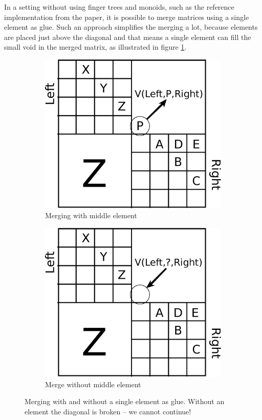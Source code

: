\documentclass[a4paper,12pt,twosided]{report}
\begin{document}
In a setting without using finger trees and monoids, such as the reference
implementation from the paper, it is possible to merge matrices using a single
element as glue. Such an approach simplifies the merging a lot, because elements
are placed just above the diagonal and that means a single element can fill the
small void in the merged matrix, as illustrated in figure \ref{mergein}.

\begin{figure}[H]
\centering
\begin{subfigure}[H]{.45\textwidth}
\includegraphics[width=.9\textwidth]{merge-with-element.eps}
\caption{Merging with middle element}
\end{subfigure}
\begin{subfigure}[H]{.45\textwidth}
\includegraphics[width=.9\textwidth]{merge-without-element.eps}
\caption{Merge without middle element}
\end{subfigure}
\caption{\label{mergein}Merging with and without a single element as glue.
Without an element the diagonal is broken -- we cannot continue!}
\end{figure}
\end{document}
